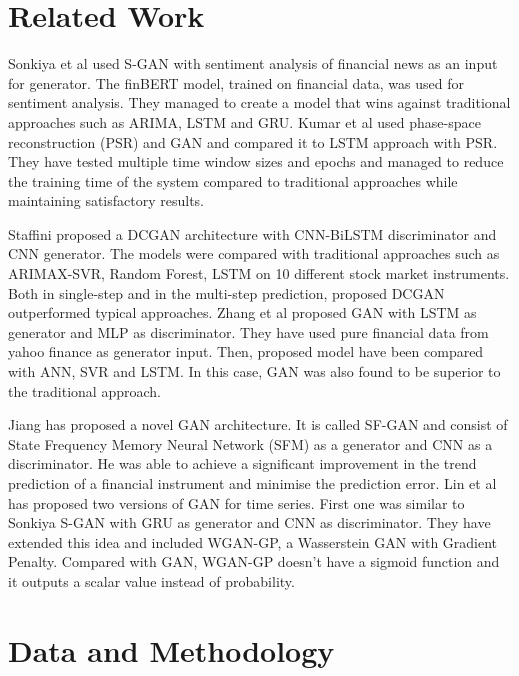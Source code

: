 \documentclass[11pt]{article} %
\begin{document}
\section{Related Work}
Sonkiya et al \cite{s-gan} used S-GAN with sentiment analysis of financial news as an input for generator. The finBERT model, trained on financial data, was used for sentiment analysis. They managed to create a model that wins against traditional approaches such as ARIMA, LSTM and GRU. Kumar et al  \cite{gan-stock} used phase-space reconstruction (PSR) and GAN and compared it to LSTM approach with PSR. They have tested multiple time window sizes and epochs and managed to reduce the training time of the system compared to traditional approaches while maintaining satisfactory results.

Staffini \cite{gan-cnn} proposed a DCGAN architecture with CNN-BiLSTM discriminator and CNN generator. The models were compared with traditional approaches such as ARIMAX-SVR, Random Forest, LSTM on 10 different stock market instruments. Both in single-step and in the multi-step prediction, proposed DCGAN outperformed typical approaches. Zhang et al \cite{gan-zhang} proposed GAN with LSTM as generator and MLP as discriminator. They have used pure financial data from yahoo finance as generator input. Then, proposed model have been compared with ANN, SVR and LSTM. In this case, GAN was also found to be superior to the traditional approach. 

Jiang \cite{gan-Jjang} has proposed a novel GAN architecture. It is called SF-GAN and consist of 
State Frequency Memory Neural Network (SFM) as a generator and CNN as a discriminator. 
He was able to achieve a significant improvement in the trend prediction of a financial instrument and minimise the prediction error.  Lin et al \cite{gan-lin} has proposed two versions of GAN for time series. First one was similar to Sonkiya S-GAN with GRU as generator and CNN as discriminator. They have extended this idea and included WGAN-GP, a Wasserstein GAN with Gradient Penalty. Compared with GAN, WGAN-GP doesn't have a sigmoid function and it outputs a scalar value instead of probability.



\section{Data and Methodology}
\end{document}
